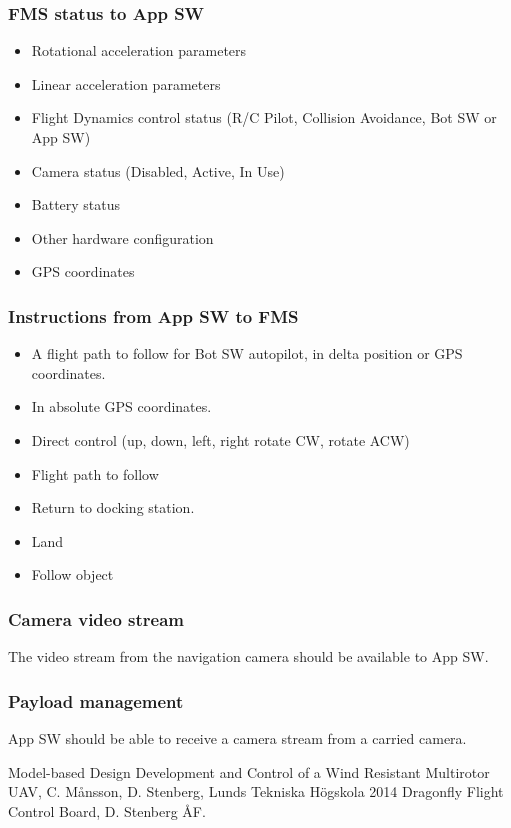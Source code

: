 \documentclass[a4paper]{article}
\begin{document}
\subsubsection{FMS status to App SW}
\label{sec:fms-status-2-app}
\begin{itemize}
\item Rotational acceleration parameters
\item Linear acceleration parameters
\item Flight Dynamics control status (R/C Pilot, Collision Avoidance, Bot SW or App SW)
\item Camera status (Disabled, Active, In Use)
\item Battery status
\item Other hardware configuration
\item GPS coordinates
\end{itemize}
\subsubsection{Instructions from App SW to FMS}
\label{sec:app-cmds-2-fms}
\begin{itemize}
\item A flight path to follow for Bot SW autopilot, in delta position or GPS coordinates.
\item In absolute GPS coordinates.
\item Direct control (up, down, left, right rotate CW, rotate ACW)
\item Flight path to follow
\item Return to docking station.
\item Land
\item Follow object
\end{itemize}
\subsubsection{Camera video stream}
The video stream from the navigation camera should be available to App SW.

\subsubsection{Payload management}
App SW should be able to receive a camera stream from a carried camera.

\begin{thebibliography}{99}
 Model-based Design Development and Control of a Wind Resistant Multirotor UAV, C. Månsson, D. Stenberg, Lunds Tekniska Högskola 2014
 Dragonfly Flight Control Board, D. Stenberg ÅF.
\end{thebibliography}
\end{document}
